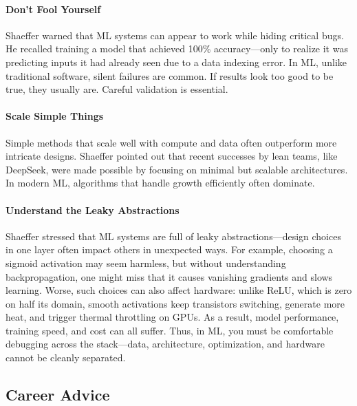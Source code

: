 
\paragraph{Don't Fool Yourself}
Shaeffer warned that ML systems can appear to work while hiding critical bugs.
He recalled training a model that achieved 100\% accuracy---only to realize it was predicting inputs it had already seen due to a data indexing error.
In ML, unlike traditional software, silent failures are common.
If results look too good to be true, they usually are.
Careful validation is essential.

\paragraph{Scale Simple Things}
Simple methods that scale well with compute and data often outperform more intricate designs.
Shaeffer pointed out that recent successes by lean teams, like DeepSeek, were made possible by focusing on minimal but scalable architectures.
In modern ML, algorithms that handle growth efficiently often dominate.

\paragraph{Understand the Leaky Abstractions}
Shaeffer stressed that ML systems are full of leaky abstractions---design choices in one layer often impact others in unexpected ways.
For example, choosing a sigmoid activation may seem harmless, but without understanding backpropagation, one might miss that it causes vanishing gradients and slows learning.
Worse, such choices can also affect hardware: unlike ReLU, which is zero on half its domain, smooth activations keep transistors switching, generate more heat, and trigger thermal throttling on GPUs.
As a result, model performance, training speed, and cost can all suffer.
Thus, in ML, you must be comfortable debugging across the stack---data, architecture, optimization, and hardware cannot be cleanly separated.

\subsection{Career Advice}

